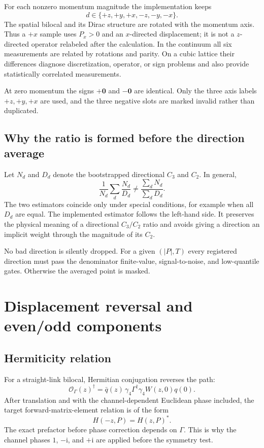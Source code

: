 \documentclass[11pt]{article}
\numberwithin{equation}{section}
\newcommand{\ii}{\mathrm{i}}
\newcommand{\cO}{\mathcal{O}}
\begin{document}
For each nonzero momentum magnitude the implementation keeps
\begin{equation}
  d\in\{+z,+y,+x,-z,-y,-x\}.
  \label{eq:direction-list}
\end{equation}
The spatial bilocal and its Dirac structure are rotated with the momentum
axis.  Thus a $+x$ sample uses $P_x>0$ and an $x$-directed displacement;
it is not a $z$-directed operator relabeled after the calculation.  In the
continuum all six measurements are related by rotations and parity.  On a
cubic lattice their differences diagnose discretization, operator, or sign
problems and also provide statistically correlated measurements.

At zero momentum the signs $+\bm 0$ and $-\bm 0$ are identical.  Only the
three axis labels $+z,+y,+x$ are used, and the three negative slots are marked
invalid rather than duplicated.

\subsection{Why the ratio is formed before the direction average}

Let $N_d$ and $D_d$ denote the bootstrapped directional $C_3$ and $C_2$.
In general,
\begin{equation}
  \frac{1}{N_d}\sum_d\frac{N_d}{D_d}
  \neq
  \frac{\sum_d N_d}{\sum_d D_d}.
  \label{eq:noncommuting-average}
\end{equation}
The two estimators coincide only under special conditions, for example when
all $D_d$ are equal.  The implemented estimator follows the left-hand side.
It preserves the physical meaning of a directional $C_3/C_2$ ratio and avoids
giving a direction an implicit weight through the magnitude of its $C_2$.

No bad direction is silently dropped.  For a given $(|P|,T)$ every registered
direction must pass the denominator finite-value, signal-to-noise, and
low-quantile gates.  Otherwise the averaged point is masked.

\section{Displacement reversal and even/odd components}

\subsection{Hermiticity relation}

For a straight-link bilocal, Hermitian conjugation reverses the path:
\begin{equation}
  \cO_\Gamma(z)^\dagger
  =\bar q(z)\,\gamma_4\Gamma^\dagger\gamma_4
   W(z,0)q(0).
  \label{eq:operator-dagger}
\end{equation}
After translation and with the channel-dependent Euclidean phase included,
the target forward-matrix-element relation is of the form
\begin{equation}
  H(-z,P)=H(z,P)^*.
  \label{eq:hermiticity-target}
\end{equation}
The exact prefactor before phase correction depends on $\Gamma$.  This is why
the channel phases $1$, $-\ii$, and $+\ii$ are applied before the symmetry
test.
\end{document}
